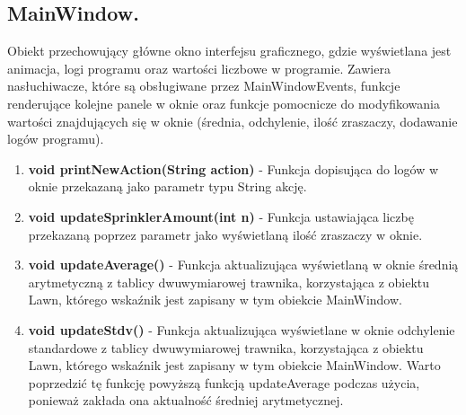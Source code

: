 \documentclass[a4paper]{article}
\begin{document}
\subsection{MainWindow.}
Obiekt przechowujący główne okno interfejsu graficznego, gdzie wyświetlana jest animacja, logi programu oraz wartości liczbowe w programie. Zawiera nasłuchiwacze, które są obsługiwane przez MainWindowEvents, funkcje renderujące kolejne panele w oknie oraz funkcje pomocnicze do modyfikowania wartości znajdujących się w oknie (średnia, odchylenie, ilość zraszaczy, dodawanie logów programu).
\begin{enumerate}
    	\item \textbf{void printNewAction(String action)} - Funkcja dopisująca do logów w oknie przekazaną jako parametr typu String akcję. 
    	\item \textbf{void updateSprinklerAmount(int n)} - Funkcja ustawiająca liczbę przekazaną poprzez parametr jako wyświetlaną ilość zraszaczy w oknie.
    	\item \textbf{void updateAverage()} - Funkcja aktualizująca wyświetlaną w oknie średnią arytmetyczną z tablicy dwuwymiarowej trawnika, korzystająca z obiektu Lawn, którego wskaźnik jest zapisany w tym obiekcie MainWindow.
    	\item \textbf{void updateStdv()} - Funkcja aktualizująca wyświetlane w oknie odchylenie standardowe z tablicy dwuwymiarowej trawnika, korzystająca z obiektu Lawn, którego wskaźnik jest zapisany w tym obiekcie MainWindow. Warto poprzedzić tę funkcję powyższą funkcją updateAverage podczas użycia, ponieważ zakłada ona aktualność średniej arytmetycznej.
\end{enumerate}
\end{document}
